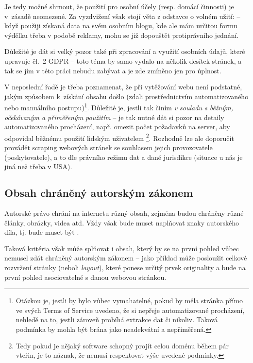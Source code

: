 \documentclass[thesis=B,czech]{FITthesis}[2012/06/26]
\begin{document}
Je tedy možné shrnout, že použití pro osobní účely (resp. domácí činnosti) je v zásadě neomezené. Za vyzdvižení však stojí věta z odstavce o volném užití:  -- když použiji získaná data na svém osobním blogu, kde ale mám určitou formu výdělku třeba v podobě reklamy, mohu se již dopouštět protiprávního jednání.

Důležité je dát si velký pozor také při zpracování a využití osobních údajů, které upravuje čl.~2 GDPR -- toto téma by samo vydalo na několik desítek stránek, a tak se jím v této práci nebudu zabývat a je zde zmíněno jen pro úplnost.

V neposlední řadě je třeba poznamenat, že při vytěžování webu není podstatné, jakým způsobem k získání obsahu došlo (zdali prostřednictvím automatizovaného nebo manuálního postupu)\footnote{Otázkou je, jestli by bylo vůbec vymahatelné, pokud by měla stránka přímo ve svých Terms of Service uvedeno, že si nepřeje automatizované procházení, nehledě na to, jestli zároveň probíhá extrakce dat či nikoliv. Taková podmínka by mohla být brána jako neadekvátní a nepřiměřená.}. Důležité je, jestli tak činím \emph{v souladu s běžným, očekávaným a přiměřeným použitím} -- je tak nutné dát si pozor na detaily automatizovaného procházení, např. omezit počet požadavků na server, aby odpovídal běžnému použití lidským uživatelem \footnote{Tedy pokud je nějaký software schopný projít celou doménu během pár vteřin, je to náznak, že nemusí respektovat výše uvedené podmínky.}. Rozhodně lze ale doporučit provádět scraping webových stránek se souhlasem jejich provozovatele (poskytovatele), a to dle právního režimu dat a dané jurisdikce (situace u nás je jiná než třeba v USA).\cite{rozhovor}

\subsection{Obsah chráněný autorským zákonem}
Autorské právo chrání na internetu různý obsah, zejména budou chráněny různé články, obrázky, videa atd. Vždy však bude muset naplňovat znaky autorského díla, tj. bude muset být  \cite[\S~2 odst.~1]{autorsky_zakon}.

Taková kritéria však může splňovat i obsah, který by se na první pohled vůbec nemusel zdát chráněný autorským zákonem -- jako příklad může posloužit celkové rozvržení stránky (neboli \textit{layout}), které ponese určitý prvek originality a bude na první pohled asociovatelné s danou webovou stránkou.
\end{document}
